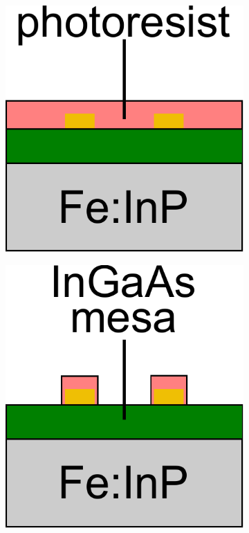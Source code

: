 \begin{figure}[h]
    \centering
    \begin{subfigure}[b]{0.225\textwidth}
        \centering
        \includegraphics[width=\textwidth]{figures/Fabrication/fab2_1.pdf}
        \caption{}
        \label{fig:fab21}
    \end{subfigure}
    \hfill
    \begin{subfigure}[b]{0.225\textwidth}
        \centering
        \includegraphics[width=\textwidth]{figures/Fabrication/fab2_2.pdf}

\end{subfigure}
\end{figure}
